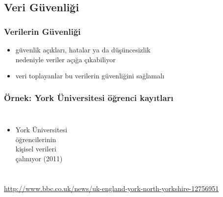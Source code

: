 \documentclass[dvipsnames]{beamer}
\theoremstyle{definition}
\theoremstyle{example}
\theoremstyle{plain}
\begin{document}
\subsection{Veri Güvenliği}

\begin{frame}
  \frametitle{Verilerin Güvenliği}

  \begin{itemize}
    \item güvenlik açıkları, hatalar ya da düşüncesizlik\\
      nedeniyle veriler açığa çıkabiliyor
    \item veri toplayanlar bu verilerin güvenliğini sağlamalı
  \end{itemize}
\end{frame}

\begin{frame}
  \frametitle{Örnek: York Üniversitesi öğrenci kayıtları}

  \begin{columns}

    \begin{itemize}
      \item York Üniversitesi\\
        öğrencilerinin\\
        kişisel verileri\\
        çalınıyor (2011)
    \end{itemize}
  \end{columns}

  \medskip
  \tiny{\url{http://www.bbc.co.uk/news/uk-england-york-north-yorkshire-12756951}}\\
\end{frame}
\end{document}
